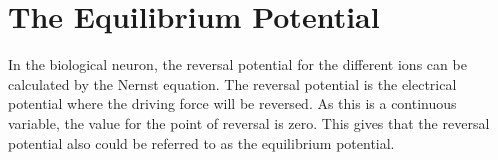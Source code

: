 

\label{secMatematiskModelleringAvBioNeuron}





















\section{The Equilibrium Potential}
\label{ssecTheEquilibriumPotential}
In the biological neuron, the reversal potential for the different ions can be calculated by the Nernst equation. 
The reversal potential is the electrical potential where the driving force will be reversed.
As this is a continuous variable, the value for the point of reversal is zero. 
This gives that the reversal potential also could be referred to as the equilibrium potential.






